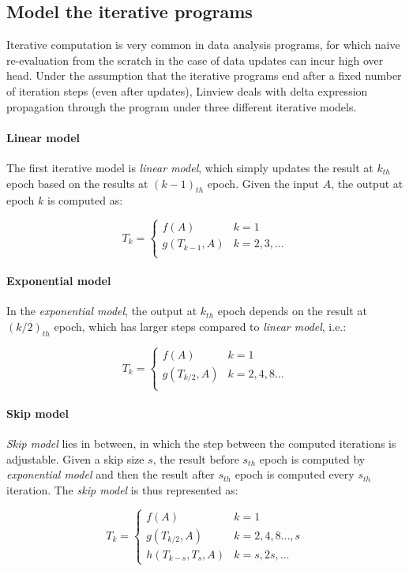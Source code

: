 \subsection{Model the iterative programs}\label{sec: iterative_model}
Iterative computation is very common in data analysis programs, for which naive re-evaluation from the scratch in the case of data updates can incur high over head. Under the assumption that the iterative programs end after a fixed number of iteration steps (even after updates), Linview deals with delta expression propagation through the program under three different iterative models.

\paragraph{Linear model} The first iterative model is {\em linear model}, which simply updates the result at $k_{th}$ epoch based on the results at $(k-1)_{th}$ epoch. Given the input $A$, the output at epoch $k$ is computed as:

\[T_k=
\begin{cases}
f(A)& k=1\\
g(T_{k-1}, A) & k=2,3,\dots\\
\end{cases}
\]

\paragraph{Exponential model} In the {\em exponential model}, the output at $k_{th}$ epoch depends on the result at $(k/2)_{th}$ epoch, which has larger steps compared to {\em linear model}, i.e.:

\[
T_k=
\begin{cases}
f(A)& k=1\\
g(T_{k/2}, A) & k=2,4,8\dots\\
\end{cases}
\]

\paragraph{Skip model} {\em Skip model} lies in between, in which the step between the computed iterations is adjustable. Given a skip size $s$, the result before $s_{th}$ epoch is computed by {\em exponential model} and then the result after $s_{th}$ epoch is computed every $s_{th}$ iteration. The {\em skip model} is thus represented as:

\[
T_k=
\begin{cases}
f(A)& k=1\\
g(T_{k/2}, A) & k=2,4,8\dots,s\\
h(T_{k-s}, T_{s}, A) & k=s, 2s,\dots
\end{cases}
\]

